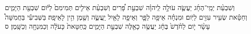 \documentclass{openreader}
\begin{document}
וְשִׁבְעַ֨ת יְמֵֽי־הֶחָ֜ג יַעֲשֶׂ֧ה עֹולָ֣ה לַֽיהוָ֗ה שִׁבְעַ֣ת פָּ֠רִים וְשִׁבְעַ֨ת אֵילִ֤ים תְּמִימִם֙ לַיֹּ֔ום שִׁבְעַ֖ת הַיָּמִ֑ים וְחַטָּ֕את שְׂעִ֥יר עִזִּ֖ים לַיֹּֽום׃ 
וּמִנְחָ֗ה אֵיפָ֥ה לַפָּ֛ר וְאֵיפָ֥ה לָאַ֖יִל יַֽעֲשֶׂ֑ה וְשֶׁ֖מֶן הִ֥ין לָאֵיפָֽה׃ 
בַּשְּׁבִיעִ֡י בַּחֲמִשָּׁה֩ עָשָׂ֨ר יֹ֤ום לַחֹ֨דֶשׁ֙ בֶּחָ֔ג יַעֲשֶׂ֥ה כָאֵ֖לֶּה שִׁבְעַ֣ת הַיָּמִ֑ים כַּֽחַטָּאת֙ כָּעֹלָ֔ה וְכַמִּנְחָ֖ה וְכַשָּֽׁמֶן׃ ס 
\end{document}

